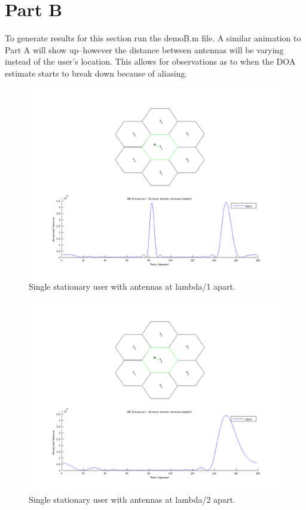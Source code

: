 \documentclass{article}
\begin{document}
\clearpage

\section{Part B}\label{partB}

To generate results for this section run the demoB.m file. A similar animation to Part A will show up--however the
distance between antennas will be varying instead of the user's location. This allows for observations as to when the
DOA estimate starts to break down because of aliasing. \\


\begin{figure}[h]
\centerline{\includegraphics[width=5in]{doc/partB1.png}}
\caption{Single stationary user with antennas at lambda/1 apart.}
\label{partb1}
\end{figure}

\begin{figure}[h]
\centerline{\includegraphics[width=5in]{doc/partB2.png}}
\caption{Single stationary user with antennas at lambda/2 apart.}
\label{partb2}
\end{figure}
\end{document}
